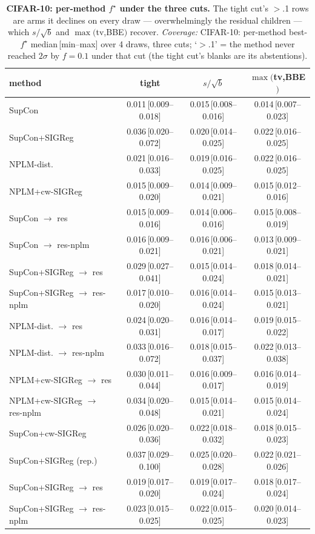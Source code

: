 \begin{table}[t]
\centering
\footnotesize
\begin{tabular}{lccc}
\toprule
method & tight & $s/\sqrt{b}$ & $\max($tv,BBE$)$ \\
\midrule
SupCon & 0.011\,[0.009--0.018] & 0.015\,[0.008--0.016] & 0.014\,[0.007--0.023] \\
SupCon+SIGReg & 0.036\,[0.020--0.072] & 0.020\,[0.014--0.025] & 0.022\,[0.016--0.025] \\
NPLM-dist. & 0.021\,[0.016--0.033] & 0.019\,[0.016--0.025] & 0.022\,[0.016--0.025] \\
NPLM+cw-SIGReg & 0.015\,[0.009--0.020] & 0.014\,[0.009--0.021] & 0.015\,[0.012--0.016] \\
\quad SupCon $\to$ res & 0.015\,[0.009--0.016] & 0.014\,[0.006--0.016] & 0.015\,[0.008--0.019] \\
\quad SupCon $\to$ res-nplm & 0.016\,[0.009--0.021] & 0.016\,[0.006--0.021] & 0.013\,[0.009--0.021] \\
\quad SupCon+SIGReg $\to$ res & 0.029\,[0.027--0.041] & 0.015\,[0.014--0.024] & 0.018\,[0.014--0.021] \\
\quad SupCon+SIGReg $\to$ res-nplm & 0.017\,[0.010--0.020] & 0.016\,[0.014--0.024] & 0.015\,[0.013--0.021] \\
\quad NPLM-dist. $\to$ res & 0.024\,[0.020--0.031] & 0.016\,[0.014--0.017] & 0.019\,[0.015--0.022] \\
\quad NPLM-dist. $\to$ res-nplm & 0.033\,[0.016--0.072] & 0.018\,[0.015--0.037] & 0.022\,[0.013--0.038] \\
\quad NPLM+cw-SIGReg $\to$ res & 0.030\,[0.011--0.044] & 0.016\,[0.009--0.017] & 0.016\,[0.014--0.019] \\
\quad NPLM+cw-SIGReg $\to$ res-nplm & 0.034\,[0.020--0.048] & 0.015\,[0.014--0.021] & 0.015\,[0.014--0.024] \\
SupCon+cw-SIGReg & 0.026\,[0.020--0.036] & 0.022\,[0.018--0.032] & 0.018\,[0.015--0.023] \\
SupCon+SIGReg (rep.) & 0.037\,[0.029--0.100] & 0.025\,[0.020--0.028] & 0.022\,[0.021--0.026] \\
\quad SupCon+SIGReg $\to$ res & 0.019\,[0.017--0.020] & 0.019\,[0.017--0.024] & 0.018\,[0.017--0.024] \\
\quad SupCon+SIGReg $\to$ res-nplm & 0.023\,[0.015--0.025] & 0.022\,[0.015--0.025] & 0.020\,[0.014--0.023] \\
\bottomrule
\end{tabular}
\caption{\textbf{CIFAR-10: per-method $f^\star$ under the three cuts.}  The tight cut's $>$.1 rows are arms it declines on every draw --- overwhelmingly the residual children --- which $s/\sqrt{b}$ and $\max($tv,BBE$)$ recover. \emph{Coverage:} CIFAR-10: per-method best-$f^\star$ median\,[min--max] over 4 draws, three cuts; `$>$.1' = the method never reached $2\sigma$ by $f{=}0.1$ under that cut (the tight cut's blanks are its abstentions).}
\label{tab:cut_perarm_cifar10}
\end{table}

